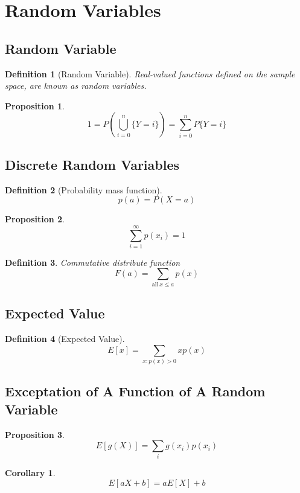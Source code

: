 \documentclass[12pt]{article}
\newtheorem{definition}{Definition}[subsection]
\newtheorem{proposition}{Proposition}[subsection]
\newtheorem{corollary}{Corollary}[subsection]
\begin{document}
    \section{Random Variables}
        \subsection{Random Variable}
        \begin{definition}[Random Variable]
            Real-valued functions defined on the sample space, are known as random variables.
        \end{definition}
        \begin{proposition}
            \[1 = P(\bigcup^n_{i = 0}\{Y = i\}) = \sum^n_{i = 0}P\{Y = i\}\]
        \end{proposition}
        \subsection{Discrete Random Variables}
        \begin{definition}[Probability mass function]
            \[p(a) = P(X = a)\]
        \end{definition}
        \begin{proposition}
            \[\sum^{\infty}_{i=1}p(x_i) = 1\]
        \end{proposition}
        \begin{definition}
        	Commutative distribute function \[F(a) = \sum_{\mathrm{all}\ x \leq a} p(x)\]
        \end{definition}
        \subsection{Expected Value}
            \begin{definition}[Expected Value]
                \[E[x] = \sum_{x:p(x)>0} xp(x)\]
            \end{definition}
        \subsection{Exceptation of A Function of A Random Variable}
        \begin{proposition}
            \[E[g(X)] = \sum_i g(x_i)p(x_i)\]
        \end{proposition}
        \begin{corollary}
            \[E[aX+b] = aE[X]+b\]
        \end{corollary}
\end{document}
